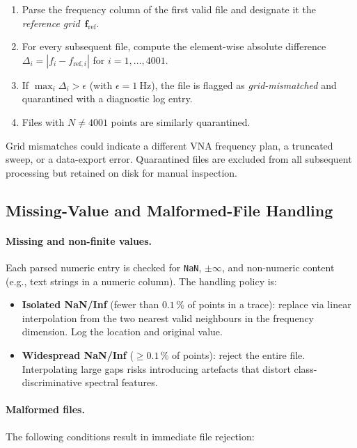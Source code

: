 \begin{enumerate}
  \item Parse the frequency column of the first valid file and designate
        it the \emph{reference grid}~$\mathbf{f}_{\text{ref}}$.
  \item For every subsequent file, compute the element-wise absolute
        difference
        $\Delta_i = |f_i - f_{\text{ref},i}|$ for
        $i=1,\dots,4001$.
  \item If $\max_i \Delta_i > \epsilon$ (with
        $\epsilon = \SI{1}{\hertz}$), the file is flagged as
        \emph{grid-mismatched} and quarantined with a diagnostic log
        entry.
  \item Files with $N \neq 4001$ points are similarly quarantined.
\end{enumerate}

Grid mismatches could indicate a different VNA frequency plan, a
truncated sweep, or a data-export error.  Quarantined files are excluded
from all subsequent processing but retained on disk for manual
inspection.

\subsection{Missing-Value and Malformed-File Handling}
\label{sec:preproc:missing}

\paragraph{Missing and non-finite values.}
Each parsed numeric entry is checked for \texttt{NaN}, $\pm\infty$, and
non-numeric content (e.g., text strings in a numeric column).
The handling policy is:

\begin{itemize}
  \item \textbf{Isolated NaN/Inf} (fewer than $0.1\,\%$ of points in a
        trace): replace via linear interpolation from the two nearest
        valid neighbours in the frequency dimension.  Log the location
        and original value.
  \item \textbf{Widespread NaN/Inf} ($\geq 0.1\,\%$ of points): reject
        the entire file.  Interpolating large gaps risks introducing
        artefacts that distort class-discriminative spectral features.
\end{itemize}

\paragraph{Malformed files.}
The following conditions result in immediate file rejection:


